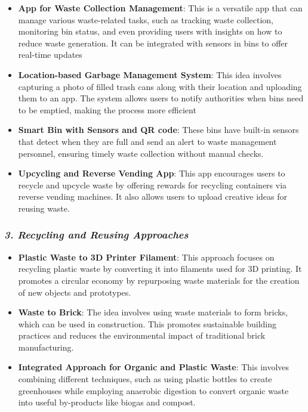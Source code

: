 \documentclass[
]{article}
\begin{document}
\begin{itemize}
\item
  \textbf{App for Waste Collection Management}: This is a versatile app
  that can manage various waste-related tasks, such as tracking waste
  collection, monitoring bin status, and even providing users with
  insights on how to reduce waste generation. It can be integrated with
  sensors in bins to offer real-time updates
\item
  \textbf{Location-based Garbage Management System}: This idea involves
  capturing a photo of filled trash cans along with their location and
  uploading them to an app. The system allows users to notify
  authorities when bins need to be emptied, making the process more
  efficient
\item
  \textbf{Smart Bin with Sensors and QR code}: These bins have built-in
  sensors that detect when they are full and send an alert to waste
  management personnel, ensuring timely waste collection without manual
  checks.
\item
  \textbf{Upcycling and Reverse Vending App}: This app encourages users
  to recycle and upcycle waste by offering rewards for recycling
  containers via reverse vending machines. It also allows users to
  upload creative ideas for reusing waste.
\end{itemize}

\hypertarget{recycling-and-reusing-approaches}{%
\subsubsection{\texorpdfstring{\emph{\textbf{3. Recycling and Reusing
Approaches}}}{3. Recycling and Reusing Approaches}}\label{recycling-and-reusing-approaches}}

\begin{itemize}
\item
  \textbf{Plastic Waste to 3D Printer Filament}: This approach focuses
  on recycling plastic waste by converting it into filaments used for 3D
  printing. It promotes a circular economy by repurposing waste
  materials for the creation of new objects and prototypes.
\item
  \textbf{Waste to Brick}: The idea involves using waste materials to
  form bricks, which can be used in construction. This promotes
  sustainable building practices and reduces the environmental impact of
  traditional brick manufacturing.
\item
  \textbf{Integrated Approach for Organic and Plastic Waste}: This
  involves combining different techniques, such as using plastic bottles
  to create greenhouses while employing anaerobic digestion to convert
  organic waste into useful by-products like biogas and compost.
\end{itemize}
\end{document}
